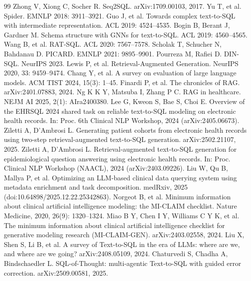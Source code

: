 \documentclass[11pt]{article}
\begin{document}
\begin{thebibliography}{99}
 Zhong V, Xiong C, Socher R. Seq2SQL. arXiv:1709.00103, 2017.
 Yu T, et al. Spider. EMNLP 2018: 3911--3921.
 Guo J, et al. Towards complex text-to-SQL with intermediate representation. ACL 2019: 4524--4535.
 Bogin B, Berant J, Gardner M. Schema structure with GNNs for text-to-SQL. ACL 2019: 4560--4565.
 Wang B, et al. RAT-SQL. ACL 2020: 7567--7578.
 Scholak T, Schucher N, Bahdanau D. PICARD. EMNLP 2021: 9895--9901.
 Pourreza M, Rafiei D. DIN-SQL. NeurIPS 2023.
 Lewis P, et al. Retrieval-Augmented Generation. NeurIPS 2020, 33: 9459--9474.
 Chang Y, et al. A survey on evaluation of large language models. ACM TIST 2024, 15(3): 1--45.
 Finardi P, et al. The chronicles of RAG. arXiv:2401.07883, 2024.
 Ng K K Y, Matsuba I, Zhang P C. RAG in healthcare. NEJM AI 2025, 2(1): AIra2400380.
 Lee G, Kweon S, Bae S, Choi E. Overview of the EHRSQL 2024 shared task on reliable text-to-SQL modeling on electronic health records. In: Proc. 6th Clinical NLP Workshop, 2024 (arXiv:2405.06673).
 Ziletti A, D'Ambrosi L. Generating patient cohorts from electronic health records using two-step retrieval-augmented text-to-SQL generation. arXiv:2502.21107, 2025.
 Ziletti A, D'Ambrosi L. Retrieval-augmented text-to-SQL generation for epidemiological question answering using electronic health records. In: Proc. Clinical NLP Workshop (NAACL), 2024 (arXiv:2403.09226).
 Liu W, Qu B, Mallya P, et al. Optimizing an LLM-based clinical data querying system using metadata enrichment and task decomposition. medRxiv, 2025 (doi:10.64898/2025.12.22.25342863).
 Norgeot B, et al. Minimum information about clinical artificial intelligence modeling: the MI-CLAIM checklist. Nature Medicine, 2020, 26(9): 1320--1324.
 Miao B Y, Chen I Y, Williams C Y K, et al. The minimum information about clinical artificial intelligence checklist for generative modeling research (MI-CLAIM-GEN). arXiv:2403.02558, 2024.
 Liu X, Shen S, Li B, et al. A survey of Text-to-SQL in the era of LLMs: where are we, and where are we going? arXiv:2408.05109, 2024.
 Chaturvedi S, Chadha A, Bindschaedler L. SQL-of-Thought: multi-agentic Text-to-SQL with guided error correction. arXiv:2509.00581, 2025.

\end{thebibliography}
\end{document}
